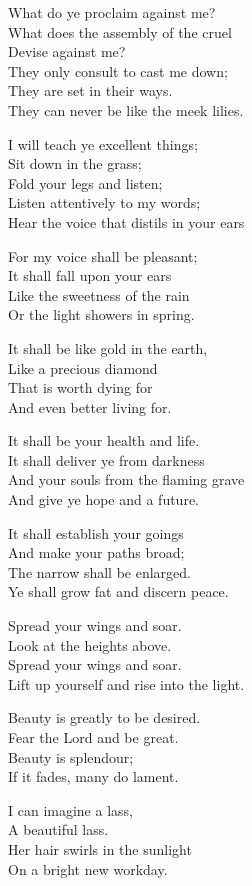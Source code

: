 \documentclass[
]{book}
\begin{document}
What do ye proclaim against me?\\
What does the assembly of the cruel\\
Devise against me?\\
They only consult to cast me down;\\
They are set in their ways.\\
They can never be like the meek lilies.

I will teach ye excellent things;\\
Sit down in the grass;\\
Fold your legs and listen;\\
Listen attentively to my words;\\
Hear the voice that distils in your ears

For my voice shall be pleasant;\\
It shall fall upon your ears\\
Like the sweetness of the rain\\
Or the light showers in spring.

It shall be like gold in the earth,\\
Like a precious diamond\\
That is worth dying for\\
And even better living for.

It shall be your health and life.\\
It shall deliver ye from darkness\\
And your souls from the flaming grave\\
And give ye hope and a future.

It shall establish your goings\\
And make your paths broad;\\
The narrow shall be enlarged.\\
Ye shall grow fat and discern peace.

Spread your wings and soar.\\
Look at the heights above.\\
Spread your wings and soar.\\
Lift up yourself and rise into the light.

Beauty is greatly to be desired.\\
Fear the Lord and be great.\\
Beauty is splendour;\\
If it fades, many do lament.

I can imagine a lass,\\
A beautiful lass.\\
Her hair swirls in the sunlight\\
On a bright new workday.
\end{document}
